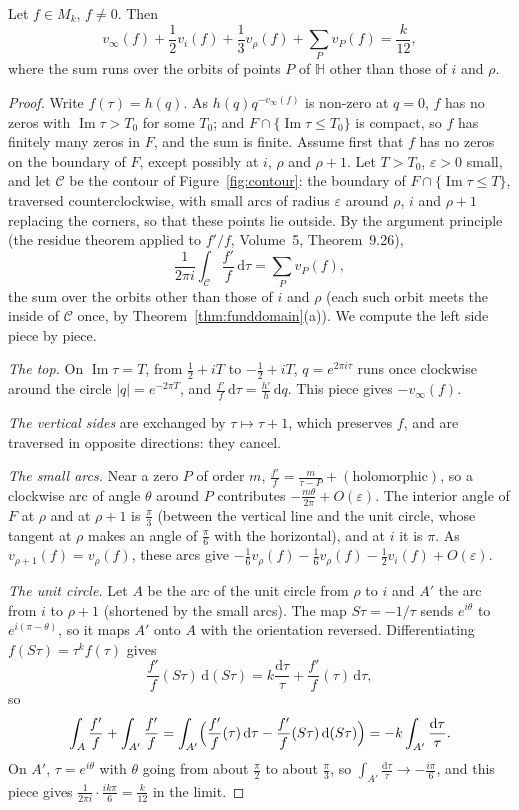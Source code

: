 \begin{theorem}\label{thm:valence}
Let $f\in M_k$, $f\ne0$. Then
\[
v_\infty(f)+\frac12v_i(f)+\frac13v_\rho(f)+\sum_Pv_P(f)=\frac k{12},
\]
where the sum runs over the orbits of points $P$ of $\mathbb H$ other than those of $i$ and $\rho$.
\end{theorem}
\begin{proof}
Write $f(\tau)=h(q)$. As $h(q)q^{-v_\infty(f)}$ is non-zero at $q=0$, $f$ has no zeros with $\operatorname{Im}\tau>T_0$ for some $T_0$; and $F\cap\{\operatorname{Im}\tau\le T_0\}$ is
compact, so $f$ has finitely many zeros in $F$, and the sum is finite. Assume first that $f$ has no zeros on the boundary of $F$, except possibly at $i$, $\rho$ and
$\rho+1$. Let $T>T_0$, $\varepsilon>0$ small, and let $\mathcal C$ be the contour of Figure~\ref{fig:contour}: the boundary of $F\cap\{\operatorname{Im}\tau\le T\}$,
traversed counterclockwise, with small arcs of radius $\varepsilon$ around $\rho$, $i$ and $\rho+1$ replacing the corners, so that these points lie outside. By the
argument principle (the residue theorem applied to $f'/f$, Volume~5, Theorem~9.26),
\[
\frac1{2\pi i}\int_{\mathcal C}\frac{f'}f\,\mathrm d\tau=\sum_Pv_P(f),
\]
the sum over the orbits other than those of $i$ and $\rho$ (each such orbit meets the inside of $\mathcal C$ once, by Theorem~\ref{thm:funddomain}(a)). We compute the
left side piece by piece.

\emph{The top.} On $\operatorname{Im}\tau=T$, from $\frac12+iT$ to $-\frac12+iT$, $q=e^{2\pi i\tau}$ runs once clockwise around the circle $|q|=e^{-2\pi T}$, and
$\frac{f'}f\,\mathrm d\tau=\frac{h'}h\,\mathrm dq$. This piece gives $-v_\infty(f)$.

\emph{The vertical sides} are exchanged by $\tau\mapsto\tau+1$, which preserves $f$, and are traversed in opposite directions: they cancel.

\emph{The small arcs.} Near a zero $P$ of order $m$, $\frac{f'}f=\frac m{\tau-P}+(\text{holomorphic})$, so a clockwise arc of angle $\theta$ around $P$ contributes
$-\frac{m\theta}{2\pi}+O(\varepsilon)$. The interior angle of $F$ at $\rho$ and at $\rho+1$ is $\frac\pi3$ (between the vertical line and the unit circle, whose tangent at
$\rho$ makes an angle of $\frac\pi6$ with the horizontal), and at $i$ it is $\pi$. As $v_{\rho+1}(f)=v_\rho(f)$, these arcs give
$-\frac16v_\rho(f)-\frac16v_\rho(f)-\frac12v_i(f)+O(\varepsilon)$.

\emph{The unit circle.} Let $A$ be the arc of the unit circle from $\rho$ to $i$ and $A'$ the arc from $i$ to $\rho+1$ (shortened by the small arcs). The map
$S\tau=-1/\tau$ sends $e^{i\theta}$ to $e^{i(\pi-\theta)}$, so it maps $A'$ onto $A$ with the orientation reversed. Differentiating $f(S\tau)=\tau^kf(\tau)$ gives
\[
\frac{f'}f(S\tau)\,\mathrm d(S\tau)=k\frac{\mathrm d\tau}\tau+\frac{f'}f(\tau)\,\mathrm d\tau,
\]
so
\[
\int_A\frac{f'}f+\int_{A'}\frac{f'}f=\int_{A'}\Bigl(\frac{f'}f(\tau)\,\mathrm d\tau-\frac{f'}f(S\tau)\,\mathrm d(S\tau)\Bigr)=-k\int_{A'}\frac{\mathrm d\tau}\tau.
\]
On $A'$, $\tau=e^{i\theta}$ with $\theta$ going from about $\frac\pi2$ to about $\frac\pi3$, so $\int_{A'}\frac{\mathrm d\tau}\tau\to-\frac{i\pi}6$, and this piece gives
$\frac1{2\pi i}\cdot\frac{ik\pi}6=\frac k{12}$ in the limit.


\end{proof}
